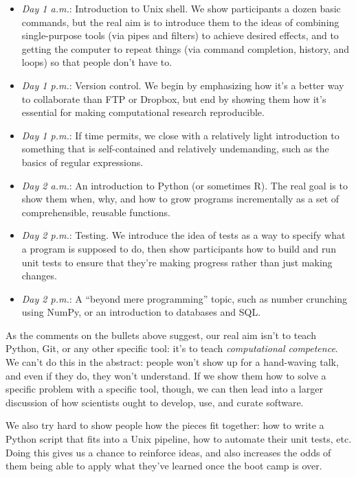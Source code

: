 \documentclass[10pt,a4paper,twocolumn]{article}
\begin{document}
\begin{itemize}
\item
  \emph{Day 1 a.m.}: Introduction to Unix shell. We show participants a
  dozen basic commands, but the real aim is to introduce them to the
  ideas of combining single-purpose tools (via pipes and filters) to
  achieve desired effects, and to getting the computer to repeat things
  (via command completion, history, and loops) so that people don't have
  to.
\item
  \emph{Day 1 p.m.}: Version control. We begin by emphasizing how it's a
  better way to collaborate than FTP or Dropbox, but end by showing them
  how it's essential for making computational research reproducible.
\item
  \emph{Day 1 p.m.}: If time permits, we close with a relatively light
  introduction to something that is self-contained and relatively
  undemanding, such as the basics of regular expressions.
\item
  \emph{Day 2 a.m.}: An introduction to Python (or sometimes R). The
  real goal is to show them when, why, and how to grow programs
  incrementally as a set of comprehensible, reusable functions.
\item
  \emph{Day 2 p.m.}: Testing. We introduce the idea of tests as a way to
  specify what a program is supposed to do, then show participants how
  to build and run unit tests to ensure that they're making progress
  rather than just making changes.
\item
  \emph{Day 2 p.m.}: A ``beyond mere programming'' topic, such as number
  crunching using NumPy, or an introduction to databases and SQL.
\end{itemize}

As the comments on the bullets above suggest, our real aim isn't to
teach Python, Git, or any other specific tool: it's to teach
\emph{computational competence}. We can't do this in the abstract:
people won't show up for a hand-waving talk, and even if they do, they
won't understand. If we show them how to solve a specific problem with a
specific tool, though, we can then lead into a larger discussion of how
scientists ought to develop, use, and curate software.

We also try hard to show people how the pieces fit together: how to
write a Python script that fits into a Unix pipeline, how to automate
their unit tests, etc. Doing this gives us a chance to reinforce ideas,
and also increases the odds of them being able to apply what they've
learned once the boot camp is over.
\end{document}

